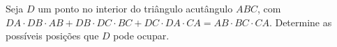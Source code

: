\begin{questao}
  Seja $D$ um ponto no interior do triângulo acutângulo
  $ABC$, com $ DA \cdot DB \cdot AB + DB \cdot DC \cdot BC + DC
  \cdot DA \cdot CA = AB \cdot BC \cdot CA$. Determine as possíveis
  posições que $D$ pode ocupar.
\end{questao}


